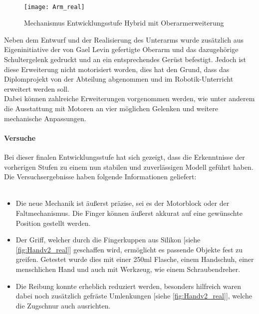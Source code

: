 \documentclass[titlepage,12pt,twoside]{article}
\begin{document}
\\
\begin{figure}[H]
	\begin{center}
		\scalebox{1}
		{\texttt{[image: Arm\_real]}}
		\caption{Mechanismus Entwicklungsstufe Hybrid mit Oberarmerweiterung}
		\label{fig:Arm_real}			
	\end{center}
\end{figure}
\hfill \break
Neben dem Entwurf und der Realisierung des Unterarms wurde zusätzlich aus 
Eigeninitiative der von Gael Levin gefertigte Oberarm und das dazugehörige 
Schultergelenk gedruckt und an ein entsprechendes Gerüst befestigt. Jedoch ist diese 
Erweiterung nicht motorisiert worden, dies hat den Grund, dass das Diplomprojekt
von der Abteilung abgenommen und im Robotik-Unterricht erweitert werden soll. \\
Dabei können zahlreiche Erweiterungen vorgenommen werden, wie unter anderem die 
Ausstattung mit Motoren an vier möglichen Gelenken und weitere mechanische 
Anpassungen. \\
\paragraph{Versuche}
\hfill \break
\hfill \break
Bei dieser finalen Entwicklungsstufe hat sich gezeigt, dass die Erkenntnisse der 
vorherigen Stufen zu einem nun stabilen und zuverlässigen Modell geführt haben. 
Die Versuchsergebnisse haben folgende Informationen geliefert: \\
\\
\begin{itemize}
	\item Die neue Mechanik ist äußerst präzise, sei es der Motorblock oder der 
	Faltmechanismus. Die Finger können äußerst akkurat auf eine gewünschte 
	Position gestellt werden.
	\item Der Griff, welcher durch die Fingerkuppen aus Silikon [siehe \textcolor{blue}{\autoref{fig:Handv2_real}}] geschaffen wird, 
	ermöglicht es passende Objekte fest zu greifen. Getestet wurde dies mit einer 
	250ml Flasche, einem Handschuh, einer menschlichen Hand und auch mit Werkzeug, 
	wie einem Schraubendreher. 
	\item Die Reibung konnte erheblich reduziert werden, besonders hilfreich waren 
	dabei noch zusätzlich gefräste Umlenkungen [siehe \textcolor{blue}{\autoref{fig:Handv2_real}}], welche die Zugschnur auch 
	ausrichten. 
\end{itemize}
\end{document}
